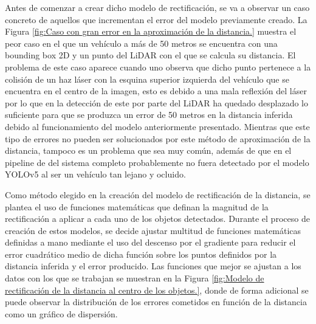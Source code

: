 Antes de comenzar a crear dicho modelo de rectificación, se va a observar un caso concreto de aquellos que incrementan el error del modelo previamente creado. La Figura \ref{fig:Caso con gran error en la aproximación de la distancia.} muestra el peor caso en el que un vehículo a más de 50 metros se encuentra con una bounding box 2D y un punto del \ac{LiDAR} con el que se calcula su distancia. El problema de este caso aparece cuando uno observa que dicho punto pertenece a la colisión de un haz láser con la esquina superior izquierda del vehículo que se encuentra en el centro de la imagen, esto es debido a una mala reflexión del láser por lo que en la detección de este por parte del \ac{LiDAR} ha quedado desplazado lo suficiente para que se produzca un error de 50 metros en la distancia inferida debido al funcionamiento del modelo anteriormente presentado. Mientras que este tipo de errores no pueden ser solucionados por este método de aproximación de la distancia, tampoco es un problema que sea muy común, además de que en el pipeline de del sistema completo probablemente no fuera detectado por el modelo YOLOv5 al ser un vehículo tan lejano y ocluido.

Como método elegido en la creación del modelo de rectificación de la distancia, se plantea el uso de funciones matemáticas que definan la magnitud de la rectificación a aplicar a cada uno de los objetos detectados. Durante el proceso de creación de estos modelos, se decide ajustar multitud de funciones matemáticas definidas a mano mediante el uso del descenso por el gradiente para reducir el error cuadrático medio de dicha función sobre los puntos definidos por la distancia inferida y el error producido. Las funciones que mejor se ajustan a los datos con los que se trabajan se muestran en la Figura \ref{fig:Modelo de rectificación de la distancia al centro de los objetos.}, donde de forma adicional se puede observar la distribución de los errores cometidos en función de la distancia como un gráfico de dispersión.

